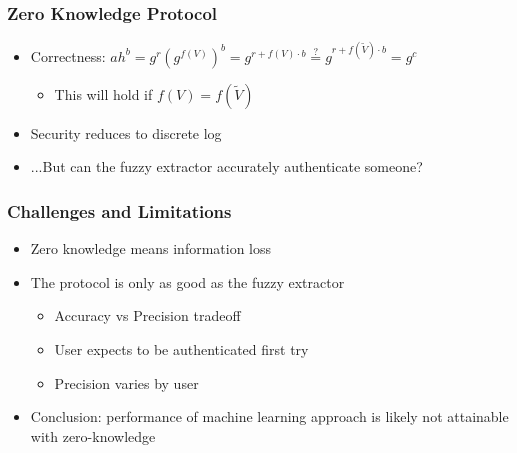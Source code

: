 \documentclass{beamer}
\begin{document}
\frame
{
  \frametitle{Zero Knowledge Protocol}
  \begin{itemize}
    \item<1->Correctness: $ah^b = g^r(g^{f(V)})^b = g^{r+f(V)\cdot b} \stackrel?= g^{r+f(\tilde V)\cdot b} = g^c$
    \begin{itemize}
      \item<2-> This will hold if $f(V) = f(\tilde V)$
    \end{itemize}
    \item<3-> Security reduces to discrete log
    \item<4-> ...But can the fuzzy extractor accurately authenticate someone?
  \end{itemize}

}
\frame
{
  \frametitle{Challenges and Limitations}
  \begin{itemize}
    \item<1-> Zero knowledge means information loss  
    \item<2-> The protocol is only as good as the fuzzy extractor
    \begin{itemize}
      \item<3-> Accuracy vs Precision tradeoff
      \item<4-> User expects to be authenticated first try
      \item<5-> Precision varies by user
    \end{itemize}
    \item<6->Conclusion: performance of machine learning approach is likely not attainable with zero-knowledge
  \end{itemize}

}
\end{document}
